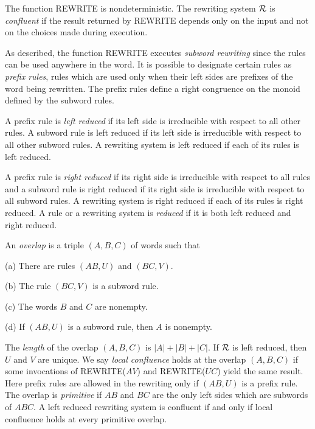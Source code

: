 \medskip

\noindent The function REWRITE is nondeterministic.  The rewriting
system ${\cal R}$ is {\it confluent\/} if the result returned by REWRITE
depends only on the input and not on the choices made during
execution.

As described, the function REWRITE executes {\it subword rewriting\/}
since the rules can be used anywhere in the word.  It is possible to
designate certain rules as {\it prefix rules}, rules which are used
only when their left sides are prefixes of the word being rewritten.
The prefix rules define a right congruence on the monoid defined by
the subword rules.

A prefix rule is {\it left reduced\/} if its left side is irreducible
with respect to all other rules.  A subword rule is left reduced if
its left side is irreducible with respect to all other subword rules.
A rewriting system is left reduced if each of its rules is left
reduced.

A prefix rule is {\it right reduced\/} if its right side is
irreducible with respect to all rules and a subword rule is right
reduced if its right side is irreducible with respect to all subword
rules.  A rewriting system is right reduced if each of its rules is
right reduced.  A rule or a rewriting system is {\it reduced} if it is
both left reduced and right reduced.

An {\it overlap\/} is a triple $(A,B,C)$ of words such that

\medskip
{\parindent=20pt
\item{(a)} There are rules $(AB,U)$ and $(BC,V)$.
\item{(b)} The rule $(BC,V)$ is a subword rule.
\item{(c)} The words $B$ and $C$ are nonempty.
\item{(d)} If $(AB,U)$ is a subword rule, then $A$ is nonempty.\par}

\medskip
\noindent The {\it length} of the overlap $(A,B,C)$ is $|A|+|B|+|C|$.
If ${\cal R}$ is left reduced, then $U$ and $V$ are unique.  We say
{\it local confluence} holds at the overlap $(A,B,C)$ if some
invocations of REWRITE($AV$) and REWRITE($UC$) yield the same result.
Here prefix rules are allowed in the rewriting only if $(AB,U)$ is a
prefix rule.  The overlap is {\it primitive} if $AB$ and $BC$ are the
only left sides which are subwords of $ABC$.  A left reduced rewriting
system is confluent if and only if local confluence holds at every
primitive overlap.


